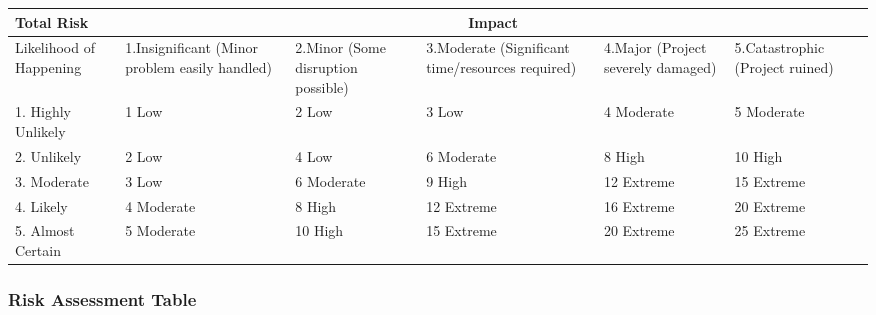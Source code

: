 \documentclass[12pt]{article}
\begin{document}
    
		    \setlength{\arrayrulewidth}{1.5\arrayrulewidth}
		    \setlength{\arrayrulewidth}{1.5\arrayrulewidth}
			\hspace*{-0.5cm}
	    	\begin{tabular}{|p{2.5cm}|p{2.3cm}|p{2.3cm}|p{2.3cm}|p{2.3cm}|p{2.5cm}|}
	    		\hline
	    		Total Risk & \multicolumn{5}{c|}{Impact} \\ \hline
	    		Likelihood of Happening & \cellcolor{green!25}1.Insignificant {\scriptsize (Minor problem easily handled)} & \cellcolor{green!33}2.Minor {\scriptsize (Some disruption possible)} & \cellcolor{yellow!50}3.Moderate {\scriptsize (Significant time/resources required)} & \cellcolor{orange!50}4.Major {\scriptsize (Project severely damaged)} & \cellcolor{red!66}5.Catastrophic {\scriptsize (Project ruined)} \\[30pt] \hline
	    		\cellcolor{green!25}1. Highly Unlikely & \cellcolor{green!75}1 Low & \cellcolor{green!75}2 Low & \cellcolor{green!75}3 Low & \cellcolor{yellow!100}4 Moderate & \cellcolor{yellow!100}5 Moderate \\[30pt] \hline
	    		\cellcolor{green!33}2. Unlikely & \cellcolor{green!75}2 Low & \cellcolor{yellow!100}4 Low & \cellcolor{yellow!100}6 Moderate & \cellcolor{orange!83}8 High & \cellcolor{orange!83}10 High \\[30pt] \hline
	    		\cellcolor{yellow!50}3. Moderate & \cellcolor{green!75}3 Low & \cellcolor{yellow!100}6 Moderate & \cellcolor{orange!83}9 High & \cellcolor{red!100}12 Extreme & \cellcolor{red!100}15 Extreme \\[30pt] \hline
	    		\cellcolor{orange!50}4. Likely & \cellcolor{yellow!100}4 Moderate & \cellcolor{orange!83}8 High & \cellcolor{red!100}12 Extreme & \cellcolor{red!100}16 Extreme & \cellcolor{red!100}20 Extreme \\[30pt] \hline
	    		\cellcolor{red!66}5. Almost Certain & \cellcolor{yellow!100}5 Moderate & \cellcolor{orange!83}10 High & \cellcolor{red!100}15 Extreme & \cellcolor{red!100}20 Extreme & \cellcolor{red!100}25 Extreme \\[30pt] \hline
	    	\end{tabular}
			\hspace*{-0.5cm}
            
            
	    	

     
     
     \subsubsection{Risk Assessment Table}
     
\end{document}

